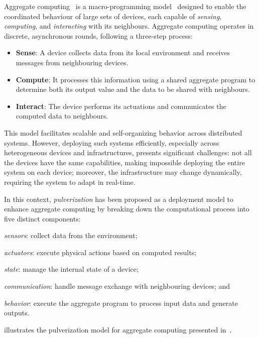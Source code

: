\documentclass[runningheads]{llncs}
\begin{document}
Aggregate computing~\cite{DBLP:journals/computer/BealPV15} is a macro-programming model~\cite{DBLP:journals/csur/Casadei23} designed to enable the coordinated behaviour of large sets of devices,
each capable of \emph{sensing},
\emph{computing},
and \emph{interacting} with its neighbours.
%
Aggregate computing operates in discrete,
asynchronous rounds,
following a three-step process:

\begin{itemize}
    \item \textbf{Sense}: A device collects data from its local environment and receives messages from neighbouring devices.
    \item \textbf{Compute}: It processes this information using a shared aggregate program to determine both its output value and the data to be shared with neighbours.
    \item \textbf{Interact}: The device performs its actuations and communicates the computed data to neighbours.
\end{itemize}

This model facilitates scalable and self-organizing behavior across distributed systems.
%
However,
deploying such systems efficiently,
especially across heterogeneous devices and infrastructures,
presents significant challenges:
not all the devices have the same capabilities,
making impossible deploying the entire system on each device;
moreover,
the infrastructure may change dynamically,
requiring the system to adapt in real-time.

In this context,
\emph{pulverization} has been proposed as a deployment model to enhance aggregate computing by breaking down the computational process into five distinct components:
\begin{enumerate*}[label=(\roman*)]
    \item \emph{sensors}: collect data from the environment;
    \item \emph{actuators}: execute physical actions based on computed results;
    \item \emph{state}: manage the internal state of a device;
    \item \emph{communication}: handle message exchange with neighbouring devices; and
    \item \emph{behavior}: execute the aggregate program to process input data and generate outputs.
\end{enumerate*}
 illustrates the pulverization model for aggregate computing presented in~\cite{DBLP:journals/fi/CasadeiPPVW20}.
\end{document}
